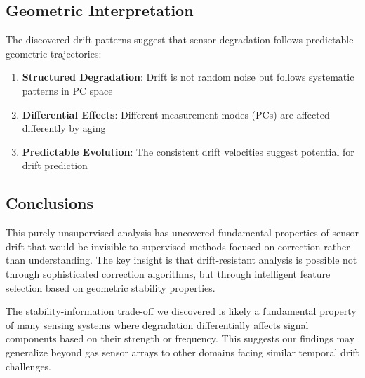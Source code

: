 \documentclass[
  letterpaper,
  DIV=11,
  numbers=noendperiod]{scrartcl}
\providecommand{\tightlist}{%
  \setlength{\itemsep}{0pt}\setlength{\parskip}{0pt}}
\begin{document}
\subsection{Geometric Interpretation}\label{geometric-interpretation}

The discovered drift patterns suggest that sensor degradation follows
predictable geometric trajectories:

\begin{enumerate}
\def\labelenumi{\arabic{enumi}.}
\tightlist
\item
  \textbf{Structured Degradation}: Drift is not random noise but follows
  systematic patterns in PC space
\item
  \textbf{Differential Effects}: Different measurement modes (PCs) are
  affected differently by aging
\item
  \textbf{Predictable Evolution}: The consistent drift velocities
  suggest potential for drift prediction
\end{enumerate}

\subsection{Conclusions}\label{conclusions}

This purely unsupervised analysis has uncovered fundamental properties
of sensor drift that would be invisible to supervised methods focused on
correction rather than understanding. The key insight is that
drift-resistant analysis is possible not through sophisticated
correction algorithms, but through intelligent feature selection based
on geometric stability properties.

The stability-information trade-off we discovered is likely a
fundamental property of many sensing systems where degradation
differentially affects signal components based on their strength or
frequency. This suggests our findings may generalize beyond gas sensor
arrays to other domains facing similar temporal drift challenges.
\end{document}
